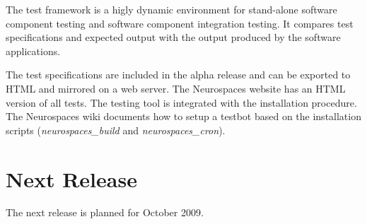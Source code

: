 \documentclass[12pt]{article}
\begin{document}
The test framework is a higly dynamic environment for stand-alone
software component testing and software component integration testing.
It compares test specifications and expected output with the output
produced by the software applications.

The test specifications are included in the alpha release and can be
exported to HTML and mirrored on a web server.  The Neurospaces
website has an HTML version of all tests.  The testing tool is
integrated with the installation procedure.  The Neurospaces wiki
documents how to setup a testbot based on the installation scripts
({\it neurospaces\_build} and {\it neurospaces\_cron}).



\section{Next Release}

The next release is planned for October 2009.






\end{document}
